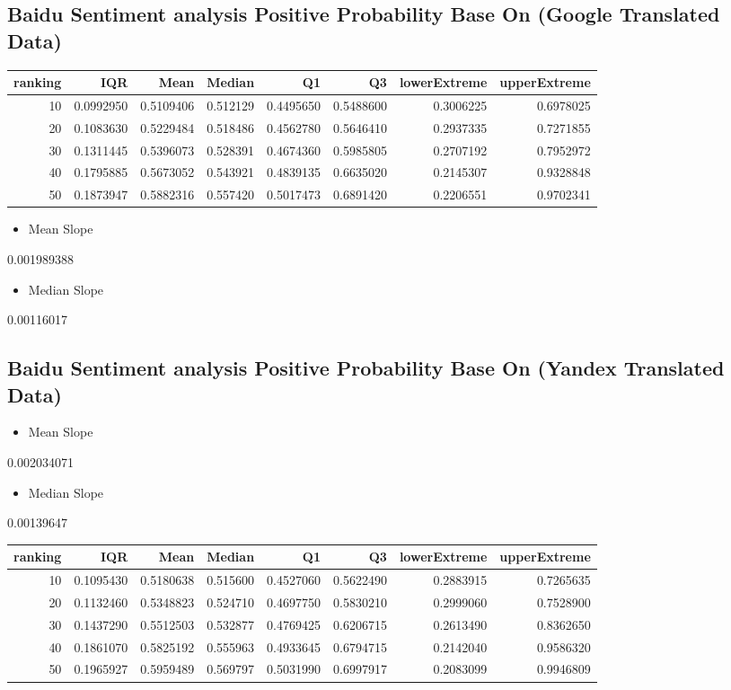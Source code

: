 \documentclass[conference,compsoc]{IEEEtran}
\begin{document}
\subsection{Baidu Sentiment analysis Positive Probability Base On (Google Translated Data)}
\label{sec:org0f265ba}
\begin{center}
\begin{tabular}{rrrrrrrr}
ranking & IQR & Mean & Median & Q1 & Q3 & lowerExtreme & upperExtreme\\
\hline
10 & 0.0992950 & 0.5109406 & 0.512129 & 0.4495650 & 0.5488600 & 0.3006225 & 0.6978025\\
20 & 0.1083630 & 0.5229484 & 0.518486 & 0.4562780 & 0.5646410 & 0.2937335 & 0.7271855\\
30 & 0.1311445 & 0.5396073 & 0.528391 & 0.4674360 & 0.5985805 & 0.2707192 & 0.7952972\\
40 & 0.1795885 & 0.5673052 & 0.543921 & 0.4839135 & 0.6635020 & 0.2145307 & 0.9328848\\
50 & 0.1873947 & 0.5882316 & 0.557420 & 0.5017473 & 0.6891420 & 0.2206551 & 0.9702341\\
\end{tabular}
\end{center}

\begin{itemize}
\item Mean Slope
\end{itemize}
0.001989388
\begin{itemize}
\item Median Slope
\end{itemize}
0.00116017
\subsection{Baidu Sentiment analysis Positive Probability Base On (Yandex Translated Data)}
\label{sec:orga60a215}
\begin{itemize}
\item Mean Slope
\end{itemize}
0.002034071
\begin{itemize}
\item Median Slope
\end{itemize}
0.00139647
\begin{center}
\begin{tabular}{rrrrrrrr}
ranking & IQR & Mean & Median & Q1 & Q3 & lowerExtreme & upperExtreme\\
\hline
10 & 0.1095430 & 0.5180638 & 0.515600 & 0.4527060 & 0.5622490 & 0.2883915 & 0.7265635\\
20 & 0.1132460 & 0.5348823 & 0.524710 & 0.4697750 & 0.5830210 & 0.2999060 & 0.7528900\\
30 & 0.1437290 & 0.5512503 & 0.532877 & 0.4769425 & 0.6206715 & 0.2613490 & 0.8362650\\
40 & 0.1861070 & 0.5825192 & 0.555963 & 0.4933645 & 0.6794715 & 0.2142040 & 0.9586320\\
50 & 0.1965927 & 0.5959489 & 0.569797 & 0.5031990 & 0.6997917 & 0.2083099 & 0.9946809\\
\end{tabular}
\end{center}
\end{document}
